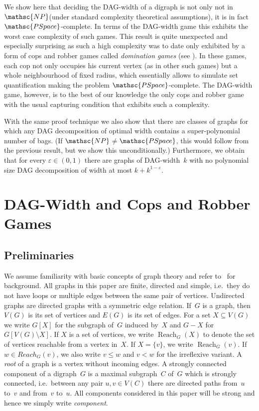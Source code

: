 \documentclass[authoryear]{article}
\makeatletter
\theoremstyle{definition}
\DeclareMathOperator{\Reach}{Reach}
\renewcommand{\epsilon}{\varepsilon}
\newcommand{\0}{\emptyset}
\newcommand{\np}{\ensuremath{\mathsc{NP}}\xspace}
\newcommand{\pspace}{\ensuremath{\mathsc{PSpace}}\xspace}
\newcommand{\dagw}{DAG-{}width\xspace}
\newcommand{\ie}{i.e.\@\xspace}
\makeatother
\begin{document}
We show here that deciding the \dagw of a
digraph is not only not in \np (under standard complexity theoretical
assumptions), it is in fact \pspace-complete. In terms of the \dagw
game this exhibits the worst case complexity of such games. This
result is quite unexpected and especially surprising as such a high
complexity was to date only exhibited by a form of cops and robber
games called \emph{domination games} (see
\cite{FominKM03,FominGT11,KreutzerOrd09}). In these games, each cop
not only occupies his current vertex (as in other such games) but a whole neighbourhood of
fixed radius, which essentially allows to simulate set quantification
making the problem \pspace-complete.
The \dagw game, however, is to the best of our
knowledge the only cops and robber game with the usual
capturing condition that exhibits such a complexity.

With the same proof technique we also show that there are classes of
graphs for which any DAG decomposition of optimal width contains a
super-polynomial number of bags. (If \np${}\not={}$\pspace, this would
follow from the previous result, but we show this unconditionally.)
Furthermore, we obtain that for every $\epsilon\in(0,1)$ there are
graphs of DAG-width~$k$ with no polynomial size DAG decomposition
of width at most $k+k^{1-\epsilon}$.



\section{DAG-Width and Cops and Robber Games}
\label{sec:prelims}

\subsection{Preliminaries}
We assume familiarity with basic concepts of graph theory and refer
to~\cite{Diestel12} for background.  All graphs in this paper are
finite, directed and simple, i.e.~they do not have loops or multiple
edges between the same pair of vertices. Undirected graphs are
directed graphs with a symmetric edge relation.  If~$G$ is a graph,
then $V(G)$ is its set of vertices and $E(G)$ is its set of edges. For
a set $X\subseteq V(G)$ we write $G[X]$ for the subgraph of~$G$
induced by~$X$ and $G-X$ for $G[V(G)\setminus X]$. If $X$ is a set of
vertices, we write $\Reach_{G}(X)$ to denote the set of vertices
reachable from a vertex in~$X$. If $X=\{v\}$, we write
$\Reach_G(v)$. If $w\in Reach_G(v)$, we also write $v\le w$ and $v<w$
for the irreflexive variant. A \emph{root} of a graph is a vertex
without incoming edges.
A strongly connected component of a digraph~$G$ is a maximal
subgraph~$C$ of~$G$ which is strongly connected, \ie~between any pair
$u,v\in V(C)$ there are directed paths from~$u$ to~$v$ and from~$v$
to~$u$. All components considered in this paper will be strong and
hence we simply write \emph{component}.  
\end{document}
